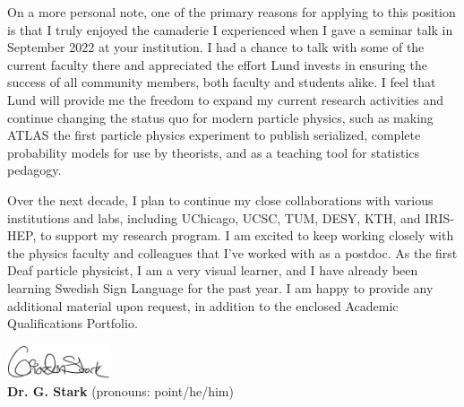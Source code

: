 On a more personal note, one of the primary reasons for applying to this position is that I truly enjoyed the camaderie I experienced when I gave a seminar talk in September 2022 at your institution. I had a chance to talk with some of the current faculty there and appreciated the effort Lund invests in ensuring the success of all community members, both faculty and students alike. I feel that Lund will provide me the freedom to expand my current research activities and continue changing the status quo for modern particle physics, such as making ATLAS the first particle physics experiment to publish serialized, complete probability models for use by theorists, and as a teaching tool for statistics pedagogy.

Over the next decade, I plan to continue my close collaborations with various institutions and labs, including UChicago, UCSC, TUM, DESY, KTH, and IRIS-HEP, to support my research program. I am excited to keep working closely with the physics faculty and colleagues that I've worked with as a postdoc. As the first Deaf particle physicist, I am a very visual learner, and I have already been learning Swedish Sign Language for the past year. I am happy to provide any additional material upon request, in addition to the enclosed Academic Qualifications Portfolio.

\includegraphics[height=1cm]{attachments/signature}\\%
	{\bfseries Dr. G. Stark} (pronouns: point/he/him)%
\vfill%
